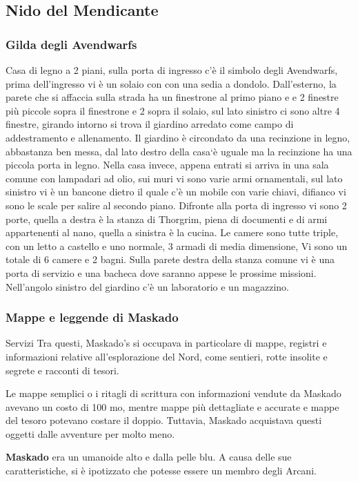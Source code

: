 \documentclass{article}
\begin{document}
          \subsection{Nido del Mendicante}
              \subsubsection{Gilda degli Avendwarfs}
Casa di legno a 2 piani, sulla porta di ingresso c'è il simbolo degli Avendwarfs, prima dell'ingresso vi è un solaio con con una sedia a dondolo. Dall'esterno, la parete che si affaccia sulla strada ha un finestrone al primo piano e e 2 finestre più piccole sopra il finestrone e 2 sopra il solaio, sul lato sinistro ci sono altre 4 finestre, girando intorno si trova il giardino arredato come campo di addestramento e allenamento. Il giardino è circondato da una recinzione in legno, abbastanza ben messa, dal lato destro della casa`è uguale ma la recinzione ha una piccola porta in legno. Nella casa invece, appena entrati si arriva in una sala comune con lampadari ad olio, sui muri vi sono varie armi ornamentali, sul lato sinistro vi è un bancone dietro il quale c'è un mobile con varie chiavi, difianco vi sono le scale per salire al secondo piano. Difronte alla porta di ingresso vi sono 2 porte, quella a destra è la stanza di Thorgrim, piena di documenti e di armi appartenenti al nano, quella a sinistra è la cucina. Le camere sono tutte triple, con un letto a castello e uno normale, 3 armadi di media dimensione, Vi sono un totale di 6 camere e 2 bagni. Sulla parete destra della stanza comune vi è una porta di servizio e una bacheca dove saranno appese le prossime missioni. Nell'angolo sinistro del giardino c'è un laboratorio e un magazzino. 
              \subsubsection{Mappe e leggende di Maskado}
Servizi\newline
Tra questi, Maskado's si occupava in particolare di mappe, registri e informazioni relative all'esplorazione del Nord, come sentieri, rotte insolite e segrete e racconti di tesori.

Le mappe semplici o i ritagli di scrittura con informazioni vendute da Maskado avevano un costo di 100 mo, mentre mappe più dettagliate e accurate e mappe del tesoro potevano costare il doppio. Tuttavia, Maskado acquistava questi oggetti dalle avventure per molto meno.

\textbf{Maskado} era un umanoide alto e dalla pelle blu. A causa delle sue caratteristiche, si è ipotizzato che potesse essere un membro degli Arcani.
\end{document}
